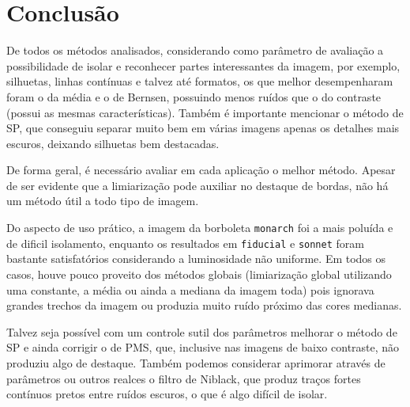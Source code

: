 \documentclass[brazilian,a4paper,twocolumn]{article}
\begin{document}
\section{Conclusão}

    De todos os métodos analisados, considerando como parâmetro de avaliação a possibilidade de isolar e reconhecer partes interessantes da imagem, por exemplo, silhuetas, linhas contínuas e talvez até formatos, os que melhor desempenharam foram o da média e o de Bernsen, possuindo menos ruídos que o do contraste (possui as mesmas características). Também é importante mencionar o método de SP, que conseguiu separar muito bem em várias imagens apenas os detalhes mais escuros, deixando silhuetas bem destacadas.

    De forma geral, é necessário avaliar em cada aplicação o melhor método. Apesar de ser evidente que a limiarização pode auxiliar no destaque de bordas, não há um método útil a todo tipo de imagem.

    Do aspecto de uso prático, a imagem da borboleta \texttt{monarch} foi a mais poluída e de dificil isolamento, enquanto os resultados em \texttt{fiducial} e \texttt{sonnet} foram bastante satisfatórios considerando a luminosidade não uniforme. Em todos os casos, houve pouco proveito dos métodos globais (limiarização global utilizando uma constante, a média ou ainda a mediana da imagem toda) pois ignorava grandes trechos da imagem ou produzia muito ruído próximo das cores medianas.

    Talvez seja possível com um controle sutil dos parâmetros melhorar o método de SP e ainda corrigir o de PMS, que, inclusive nas imagens de baixo contraste, não produziu algo de destaque. Também podemos considerar aprimorar através de parâmetros ou outros realces o filtro de Niblack, que produz traços fortes contínuos pretos entre ruídos escuros, o que é algo difícil de isolar.
\end{document}
